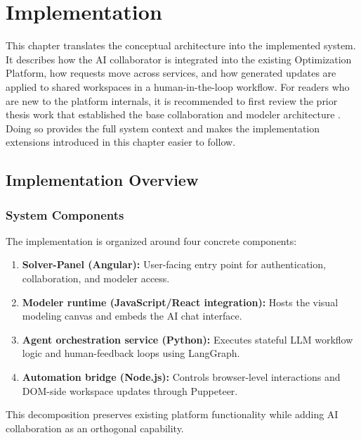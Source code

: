 \chapter{Implementation}
This chapter translates the conceptual architecture into the implemented system. It describes how the AI collaborator is integrated into the existing Optimization Platform, how requests move across services, and how generated updates are applied to shared workspaces in a human-in-the-loop workflow. For readers who are new to the platform internals, it is recommended to first review the prior thesis work that established the base collaboration and modeler architecture \cite{MarkoThesisMsc, DeniThesisMsc, MarkoThesisBsc, MaksimThesisMsc}. Doing so provides the full system context and makes the implementation extensions introduced in this chapter easier to follow.

\section{Implementation Overview}
\subsection{System Components}
The implementation is organized around four concrete components:
\begin{enumerate}
    \item \textbf{Solver-Panel (Angular):} User-facing entry point for authentication, collaboration, and modeler access.
    \item \textbf{Modeler runtime (JavaScript/React integration):} Hosts the visual modeling canvas and embeds the AI chat interface.
    \item \textbf{Agent orchestration service (Python):} Executes stateful LLM workflow logic and human-feedback loops using LangGraph.
    \item \textbf{Automation bridge (Node.js):} Controls browser-level interactions and DOM-side workspace updates through Puppeteer.
\end{enumerate}

This decomposition preserves existing platform functionality while adding AI collaboration as an orthogonal capability.

